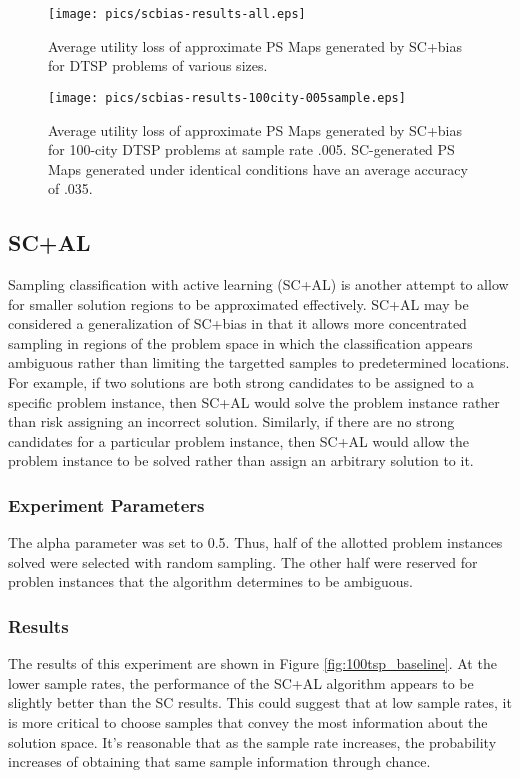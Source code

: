 \begin{figure}
\begin{center}
\texttt{[image: pics/scbias-results-all.eps]}
\caption{Average utility loss of approximate PS Maps generated by SC+bias for DTSP problems of various sizes.}
\label{fig:scbias-results-all}
\end{center}
\end{figure}

\begin{figure}
\begin{center}
\texttt{[image: pics/scbias-results-100city-005sample.eps]}
\caption{Average utility loss of approximate PS Maps generated by SC+bias for 100-city DTSP problems at sample rate .005.  SC-generated PS Maps generated under identical conditions have an average accuracy of .035.}
\label{fig:scbias-results-100city-005sample}
\end{center}
\end{figure}



\subsection{SC+AL} 


Sampling classification with active learning (SC+AL) is another attempt to allow for smaller solution regions to be approximated effectively.  SC+AL may be considered a generalization of SC+bias in that it allows more concentrated sampling in regions of the problem space in which the classification appears ambiguous rather than limiting the targetted samples to predetermined locations.  For example, if two solutions are both strong candidates to be assigned to a specific problem instance, then SC+AL would solve the problem instance rather than risk assigning an incorrect solution.  Similarly, if there are no strong candidates for a particular problem instance, then SC+AL would allow the problem instance to be solved rather than assign an arbitrary solution to it.  

\subsubsection{Experiment Parameters}  The alpha parameter was set to 0.5.  Thus, half of the allotted problem instances solved were selected with random sampling.  The other half were reserved for problen instances that the algorithm determines to be ambiguous.

\subsubsection{Results} The results of this experiment are shown in Figure \ref{fig:100tsp_baseline}.  At the lower sample rates, the performance of the SC+AL algorithm appears to be slightly better than the SC results.  This could suggest that at low sample rates, it is more critical to choose samples that convey the most information about the solution space.  It's reasonable that as the sample rate increases, the probability increases of obtaining that same sample information through chance.


